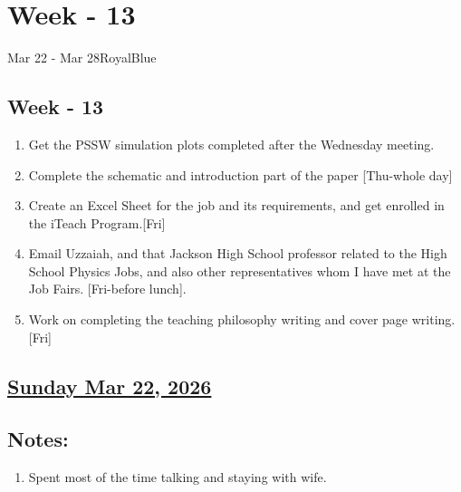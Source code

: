\section{Week - 13}
\begin{physicsmodule}{Mar 22 - Mar 28}{RoyalBlue}
  \begin{lawbox}
    \subsection*{\sffamily\bfseries Week - 13}
    \begin{enumerate}
    \item Get the PSSW simulation plots completed after the Wednesday meeting.
    \item Complete the schematic and introduction part of the paper [Thu-whole day]
    \item Create an Excel Sheet for the job and its requirements, and get enrolled in the iTeach Program.[Fri]
    \item Email Uzzaiah, and that Jackson High School professor related to the High School Physics Jobs, and also other representatives whom I have met at the Job Fairs. [Fri-before lunch].
    \item Work on completing the teaching philosophy writing and cover page writing.[Fri]
\end{enumerate}
  \end{lawbox}
\end{physicsmodule}
\subsection*{\underline{Sunday Mar 22, 2026}}
\subsection*{Notes:}
\begin{enumerate}
    \item Spent most of the time talking and staying with wife.  
\end{enumerate}
